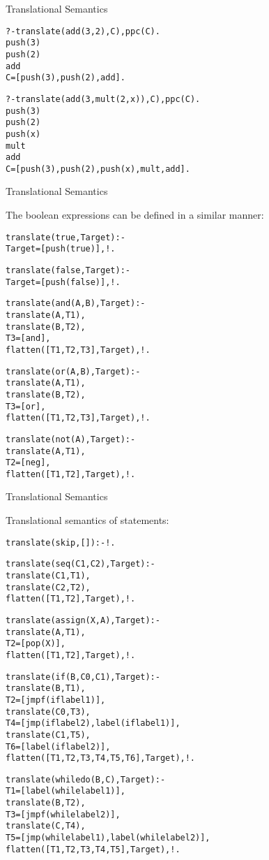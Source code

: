 \documentclass{beamer}
\begin{document}
\begin{frame}[fragile]{Translational Semantics}

\scriptsize
\begin{alltt}
?- translate(add(3,2),C),ppc(C).
    push(3)
    push(2)
    add
C = [push(3), push(2), add].
\end{alltt}

\begin{alltt}
?- translate(add(3,mult(2,x)),C),ppc(C).
    push(3)
    push(2)
    push(x)
    mult
    add
C = [push(3), push(2), push(x), mult, add].
\end{alltt}

\end{frame}

\begin{frame}[fragile]{Translational Semantics}

\small
The boolean expressions can be defined in a similar manner:
\tiny
\begin{alltt}
translate(true,Target) :-
    Target = [push(true)],!.

translate(false,Target) :-
    Target = [push(false)],!.

translate(and(A,B),Target) :-
    translate(A,T1),
    translate(B,T2),
    T3 = [and],
    flatten([T1,T2,T3],Target),!.

translate(or(A,B),Target) :-
    translate(A,T1),
    translate(B,T2),
    T3 = [or],
    flatten([T1,T2,T3],Target),!.

translate(not(A),Target) :-
    translate(A,T1),
    T2 = [neg],
    flatten([T1,T2],Target),!.
\end{alltt}

\small

\end{frame}

\begin{frame}[fragile]{Translational Semantics}

\small
Translational semantics of statements:
\tiny
\begin{alltt}
translate(skip,[]) :- !.

translate(seq(C1,C2),Target) :-
    translate(C1,T1),
    translate(C2,T2),
    flatten([T1,T2],Target),!.

translate(assign(X,A),Target) :-
    translate(A,T1),
    T2 = [pop(X)],
    flatten([T1,T2],Target),!.

translate(if(B,C0,C1),Target) :-
    translate(B,T1),
    T2 = [jmpf(iflabel1)],
    translate(C0,T3),
    T4 = [jmp(iflabel2),label(iflabel1)],
    translate(C1,T5),
    T6 = [label(iflabel2)],
    flatten([T1,T2,T3,T4,T5,T6],Target),!.

translate(whiledo(B,C),Target) :-
    T1 = [label(whilelabel1)],
    translate(B,T2),
    T3 = [jmpf(whilelabel2)],
    translate(C,T4),
    T5 = [jmp(whilelabel1),label(whilelabel2)],
    flatten([T1,T2,T3,T4,T5],Target),!.
\end{alltt}

\end{frame}
\end{document}
